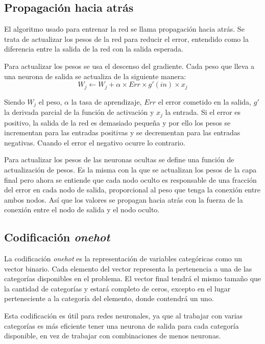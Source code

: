 \subsection{Propagación hacia atrás}
\label{sec:backprop}

El algoritmo usado para entrenar la red se llama propagación hacia atrás. Se
trata de actualizar los pesos de la red para reducir el error, entendido como
la diferencia entre la salida de la red con la salida esperada.

Para actualizar los pesos se usa el descenso del gradiente. Cada peso que lleva
a una neurona de salida se actualiza de la siguiente manera: 
\[
    W_j \leftarrow W_j + \alpha \times Err \times g'(in) \times x_j
\]

Siendo $W_j$ el peso, $\alpha$ la tasa de aprendizaje, $Err$ el error cometido
en la salida, $g'$ la derivada parcial de la función de activación y $x_j$ la
entrada. Si el error es positivo, la salida de la red es demasiado pequeña y por
ello los pesos se incrementan para las entradas positivas y se decrementan para
las entradas negativas. Cuando el error el negativo ocurre lo contrario.

Para actualizar los pesos de las neuronas ocultas se define una función de
actualización de pesos. Es la misma con la que se actualizan los pesos de la
capa final pero ahora se entiende que cada nodo oculto es responsable de una
fracción del error en cada nodo de salida, proporcional al peso que tenga la
conexión entre ambos nodos. Así que los valores se propagan hacia atrás con la
fuerza de la conexión entre el nodo de salida y el nodo oculto.

\subsection{Codificación \textit{onehot}}

La codificación \textit{onehot} es la representación de variables categóricas
como un vector binario. Cada elemento del vector representa la pertenencia a
una de las categorías disponibles en el problema. El vector final tendrá el
mismo tamaño que la cantidad de categorías y estará completo de ceros, excepto
en el lugar perteneciente a la categoría del elemento, donde contendrá un uno.

Esta codificación es útil para redes neuronales, ya que al trabajar con varias
categorías es más eficiente tener una neurona de salida para cada categoría
disponible, en vez de trabajar con combinaciones de menos neuronas.


